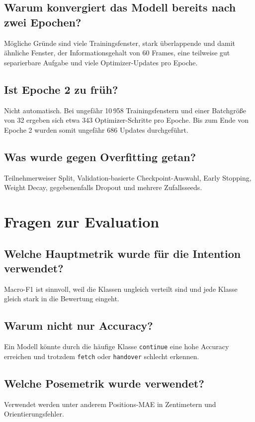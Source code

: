 \documentclass[11pt,a4paper]{article}
\begin{document}
\subsection*{Warum konvergiert das Modell bereits nach zwei Epochen?}
Mögliche Gründe sind viele Trainingsfenster, stark überlappende und damit ähnliche Fenster, der Informationsgehalt von 60 Frames, eine teilweise gut separierbare Aufgabe und viele Optimizer-Updates pro Epoche.

\subsection*{Ist Epoche 2 zu früh?}
Nicht automatisch. Bei ungefähr 10\,958 Trainingsfenstern und einer Batchgröße von 32 ergeben sich etwa 343 Optimizer-Schritte pro Epoche. Bis zum Ende von Epoche 2 wurden somit ungefähr 686 Updates durchgeführt.

\subsection*{Was wurde gegen Overfitting getan?}
Teilnehmerweiser Split, Validation-basierte Checkpoint-Auswahl, Early Stopping, Weight Decay, gegebenenfalls Dropout und mehrere Zufallsseeds.

\section{Fragen zur Evaluation}

\subsection*{Welche Hauptmetrik wurde für die Intention verwendet?}
Macro-F1 ist sinnvoll, weil die Klassen ungleich verteilt sind und jede Klasse gleich stark in die Bewertung eingeht.

\subsection*{Warum nicht nur Accuracy?}
Ein Modell könnte durch die häufige Klasse \texttt{continue} eine hohe Accuracy erreichen und trotzdem \texttt{fetch} oder \texttt{handover} schlecht erkennen.

\subsection*{Welche Posemetrik wurde verwendet?}
Verwendet werden unter anderem Positions-MAE in Zentimetern und Orientierungsfehler.
\end{document}
